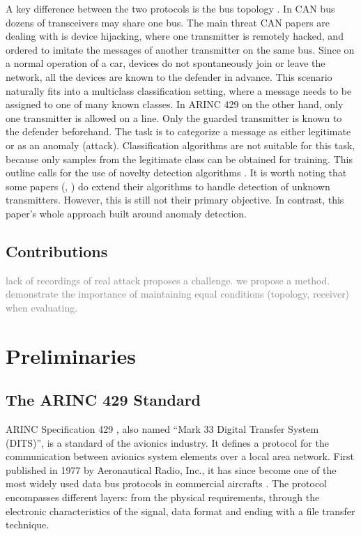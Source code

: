 \documentclass[conference]{IEEEtran}
\begin{document}
  A key difference between the two protocols is the bus topology . In CAN bus dozens of transceivers may share one bus. The main threat CAN papers are dealing with is device hijacking, where one transmitter is remotely hacked, and ordered to imitate the messages of another transmitter on the same bus. Since on a normal operation of a car, devices do not spontaneously join or leave the network, all the devices are known to the defender in advance. This scenario naturally fits into a multiclass classification setting, where a message needs to be assigned to one of many known classes. In ARINC 429 on the other hand, only one transmitter is allowed on a line. Only the guarded transmitter is known to the defender beforehand. The task is to categorize a message as either legitimate or as an anomaly (attack). Classification algorithms are not suitable for this task, because only samples from the legitimate class can be obtained for training. This outline calls for the use of novelty detection algorithms \cite{pimentel2014review}. It is worth noting that some papers (\cite{choi2018identifying}, \cite{choi2018voltageids}) do extend their algorithms to handle detection of unknown transmitters. However, this is still not their primary objective. In contrast, this paper's whole approach built around anomaly detection.
  
\subsection{Contributions}
\textcolor{gray}{lack of recordings of real attack proposes a challenge. we propose a method. demonstrate the importance of maintaining equal conditions (topology, receiver) when evaluating.}

\section{Preliminaries}
\subsection{The ARINC 429 Standard}
  ARINC Specification 429 \cite{}, also named ``Mark 33 Digital Transfer System (DITS)'', is a standard of the avionics industry. It defines a protocol for the communication between avionics system elements over a local area network. First published in 1977 by Aeronautical Radio, Inc., it has since become one of the most widely used data bus protocols in commercial aircrafts \cite{}. The protocol encompasses different layers: from the physical requirements, through the electronic characteristics of the signal, data format and ending with a file transfer technique.
\end{document}

